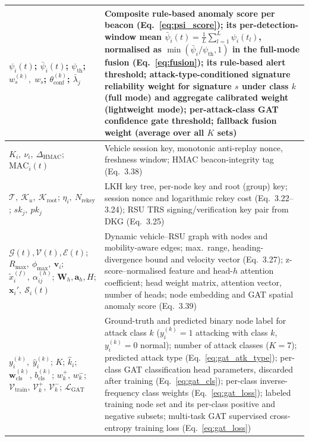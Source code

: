 \documentclass[12pt, a4paper]{report}
\begin{document}
\begin{longtable}{|m{3.6cm}|m{9.0cm}|}
\hline
$\psi_i(t)$;\;
$\bar{\psi}_i(t)$;\;
$\psi_{\mathrm{th}}$;\;
$w_s^{(k)},\;w_s$;\;
$\theta_{\mathrm{conf}}^{(k)}$;\;
$\bar{\lambda}_j$ &
Composite rule-based anomaly score per beacon
(Eq.~\eqref{eq:psi_score}); its per-detection-window mean
$\bar{\psi}_i(t) = \tfrac{1}{L}\sum_{l=1}^{L}\psi_i(t_l)$,
normalised as $\min(\bar{\psi}_i/\psi_{\mathrm{th}},1)$ in the
full-mode fusion (Eq.~\eqref{eq:fusion}); its rule-based alert
threshold; attack-type-conditioned signature reliability weight
for signature $s$ under class $k$ (full mode) and aggregate
calibrated weight (lightweight mode);
per-attack-class GAT confidence gate threshold;
fallback fusion weight (average over all $K$ sets) \\
\hline
	$K_i,\ \nu_i,\ \Delta_{\text{HMAC}}$; $\text{MAC}_i(t)$ & Vehicle session key, monotonic anti-replay nonce, freshness window; HMAC beacon-integrity tag (Eq.~3.38) \\
\hline
	$\mathcal{T},\ \mathcal{K}_u,\ \mathcal{K}_{\text{root}}$; $\eta_i,\ N_{\text{rekey}}$; $sk_j,\ pk_j$ & LKH key tree, per-node key and root (group) key; session nonce and logarithmic rekey cost (Eq.~3.22--3.24); RSU TRS signing/verification key pair from DKG (Eq.~3.25) \\
\hline
	$\mathcal{G}(t),\mathcal{V}(t),\mathcal{E}(t)$; $R_{\max},\ \phi_{\max},\ \mathbf{v}_i$; $\tilde{x}_i^{(f)},\ \alpha_{ij}^{(h)}$; $\mathbf{W}_h,\mathbf{a}_h,H$; $\mathbf{x}_i',\ \mathcal{S}_i(t)$ & Dynamic vehicle--RSU graph with nodes and mobility-aware edges; max.\ range, heading-divergence bound and velocity vector (Eq.~3.27); z-score--normalised feature and head-$h$ attention coefficient; head weight matrix, attention vector, number of heads; node embedding and GAT spatial anomaly score (Eq.~3.39) \\
\hline
$y_i^{(k)},\;\hat{y}_i^{(k)}$;\;
$K$;\;
$\hat{k}_i$;\;
$\mathbf{w}_{\mathrm{cls}}^{(k)},\,b_{\mathrm{cls}}^{(k)}$;\;
$w_k^{+},\,w_k^{-}$;\;
$\mathcal{V}_{\mathrm{train}},\,\mathcal{V}_k^{+},\,\mathcal{V}_k^{-}$;\;
$\mathcal{L}_{\mathrm{GAT}}$ &
Ground-truth and predicted binary node label for attack class $k$
($y_i^{(k)}{=}1$ attacking with class $k$, $y_i^{(k)}{=}0$ normal);
number of attack classes ($K{=}7$);
predicted attack type (Eq.~\eqref{eq:gat_atk_type});
per-class GAT classification head parameters, discarded after training
(Eq.~\eqref{eq:gat_cls});
per-class inverse-frequency class weights
(Eq.~\eqref{eq:gat_loss});
labeled training node set and its per-class positive and negative
subsets;
multi-task GAT supervised cross-entropy training loss
(Eq.~\eqref{eq:gat_loss}) \\

\end{longtable}
\end{document}
